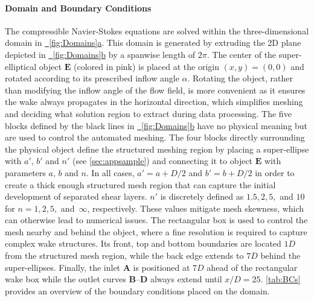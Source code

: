 \documentclass{article}
\newcommand{\subfigref}[2]{\hyperref[#1]{\figureautorefname~\ref*{#1}#2}}
\begin{document}
\paragraph{Domain and Boundary Conditions}
The compressible Navier-Stokes equations are solved within the three-dimensional domain in \subfigref{fig:Domains}{a}. This domain is generated by extruding the 2D plane depicted in \subfigref{fig:Domains}{b} by a spanwise length of $2\pi$. The center of the super-elliptical object $\textbf{E}$ (colored in pink) is placed at the origin $(x,y) = (0,0)$ and rotated according to its prescribed inflow angle $\alpha$. Rotating the object, rather than modifying the inflow angle of the flow field, is more convenient as it ensures the wake always propagates in the horizontal direction, which simplifies meshing and deciding what solution region to extract during data processing. The five blocks defined by the black lines in \subfigref{fig:Domains}{b} have no physical meaning but are used to control the automated meshing. The four blocks directly surrounding the physical object define the structured meshing region by placing a super-ellipse with $a'$, $b'$ and $n'$ (see \autoref{sec:appsample}) and connecting it to  object $\textbf{E}$ with parameters $a$, $b$ and $n$. In all cases, $a'= a + D/2$ and $b'= b + D/2$ in order to create a thick enough structured mesh region that can capture the initial development of separated shear layers. $n'$ is discretely defined as $1.5, 2, 5,$ and $10$ for $n = 1, 2, 5,$ and~$\infty$, respectively. These values mitigate mesh skewness, which can otherwise lead to numerical issues. The rectangular box is used to control the mesh nearby and behind the object, where a fine resolution is required to capture complex wake structures. Its front, top and bottom boundaries are located $1D$ from the structured mesh region, while the back edge extends to $7D$ behind the super-ellipses. Finally, the inlet $\textbf{A}$ is positioned at $7D$ ahead of the rectangular wake box while the outlet curves \textbf{B}--\textbf{D} always extend until $x/D = 25$. \autoref{tab:BCs} provides an overview of the boundary conditions placed on the domain.
\end{document}
